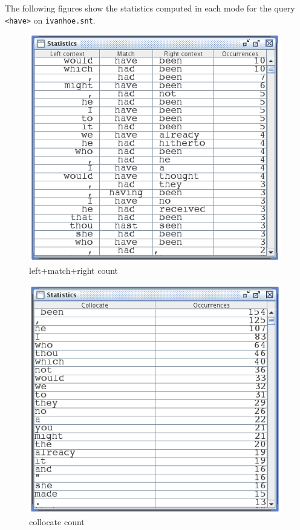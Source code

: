 \bigskip
\noindent The following figures show the statistics computed in each mode for
the query \verb$<have>$ on \verb$ivanhoe.snt$.


\bigskip
\begin{figure}[!h]
\begin{center}
\includegraphics[width=11cm]{resources/img/fig4-10.png}
\caption{left+match+right count\label{fig-statistics-mode0}}
\end{center}
\end{figure}

\begin{figure}[!h]
\begin{center}
\includegraphics[width=11cm]{resources/img/fig4-11.png}
\caption{collocate count\label{fig-statistics-mode1}}
\end{center}
\end{figure}

